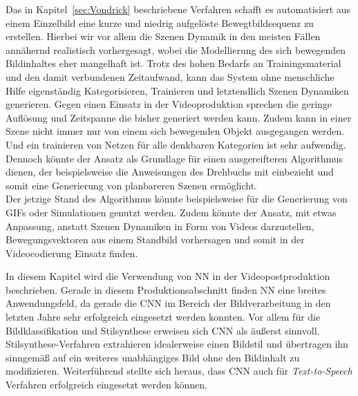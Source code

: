 \documentclass[times, 11pt,twocolumn]{article}
\begin{document}
 \label{sec:VondrickConclusion}
Das in Kapitel~\ref{sec:Vondrick} beschriebene Verfahren schafft es automatisiert aus einem Einzelbild eine kurze und niedrig aufgelöste Bewegtbildsequenz zu erstellen. Hierbei wir vor allem die Szenen Dynamik in den meisten Fällen annähernd realistisch vorhergesagt, wobei die Modellierung des sich bewegenden Bildinhaltes eher mangelhaft ist. Trotz des hohen Bedarfs an Trainingsmaterial und den damit verbundenen Zeitaufwand, kann das System ohne menschliche Hilfe eigenständig Kategorisieren, Trainieren und letztendlich Szenen Dynamiken generieren. Gegen einen Einsatz in der Videoproduktion sprechen die geringe Auflösung und Zeitspanne die bisher generiert werden kann. Zudem kann in einer Szene nicht immer nur von einem sich bewegenden Objekt ausgegangen werden. Und ein trainieren von Netzen für alle denkbaren Kategorien ist sehr aufwendig. Dennoch könnte der Ansatz als Grundlage für einen ausgereifteren Algorithmus dienen, der beispielsweise die Anweisungen des Drehbuchs mit einbezieht und somit eine Generierung von planbareren Szenen ermöglicht. \\
Der jetzige Stand des Algorithmus könnte beispielsweise für die Generierung von GIFs oder Simulationen genutzt werden. Zudem könnte der Ansatz, mit etwas Anpassung, anstatt Szenen Dynamiken in Form von Videos darzustellen, Bewegungsvektoren aus einem Standbild vorhersagen und somit in der Videocodierung Einsatz finden. 




 \label{sec:Postroduktion}

In diesem Kapitel wird die Verwendung von NN in der Videopostproduktion beschrieben. Gerade in diesem Produktionsabschnitt finden NN eine breites Anwendungsfeld, da gerade die CNN im Bereich der Bildverarbeitung in den letzten Jahre sehr erfolgreich eingesetzt werden konnten. Vor allem für die Bildklassifikation und Stilsynthese erweisen sich CNN als äußerst sinnvoll. Stilsynthese-Verfahren extrahieren idealerweise einen Bildstil und übertragen ihn sinngemäß auf ein weiteres unabhängiges Bild ohne den Bildinhalt zu modifizieren. Weiterführend stellte sich  heraus, dass CNN auch für \textit{Text-to-Speech} Verfahren erfolgreich eingesetzt werden können.\\
\end{document}
